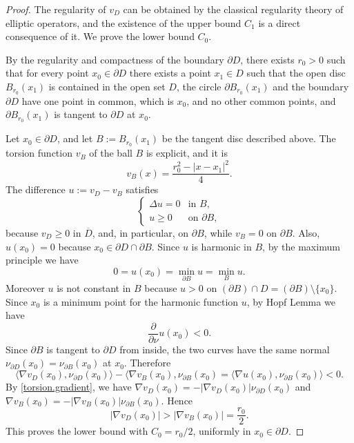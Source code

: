 \documentclass[10pt,reqno,a4paper]{article}
\numberwithin{equation}{section}
\theoremstyle{plain}
\theoremstyle{definition}
\newcommand{\la}{\langle}
\newcommand{\ra}{\rangle}
\newcommand{\pa}{\partial}
\begin{document}
\begin{proof}
The regularity of $v_D$ can be obtained by the classical regularity theory of elliptic operators, 
and the existence of the upper bound $C_1$ is a direct consequence of it. 
We prove the lower bound $C_0$.   

By the regularity and compactness of the boundary $\pa D$, 
there exists $r_0 > 0$ such that 
for every point $x_0 \in \pa D$ there exists a point $x_1 \in D$ such that 
the open disc $B_{r_0}(x_1)$ is contained in the open set $D$,  
the circle $\pa B_{r_0}(x_1)$ and the boundary $\pa D$ have one point in common, 
which is $x_0$, and no other common points, 
and $\pa B_{r_0}(x_1)$ is tangent to $\pa D$ at $x_0$. 

Let $x_0\in \pa D$, and let $B := B_{r_0}(x_1)$ be the tangent disc described above.  
The torsion function $v_B$ of the ball $B$ is explicit, and it is 
\[
v_B(x) = \frac{r_0^2 -|x-x_1|^2}{4}. 
\]
The difference $u := v_D-v_B$ satisfies
\[
\begin{cases}
\Delta u=0 & \text{in } B, 
\\
u \geq 0 & \text{on } \pa B, 
\end{cases}
\]
because $v_D \geq 0$ in $\overline D$, and, in particular, on $\pa B$, while $v_B = 0$ on $\pa B$. 
Also, $u(x_0) = 0$ because $x_0 \in \pa D \cap \pa B$. 
Since $u$ is harmonic in $B$, by the maximum principle we have 
\[
0 = u(x_0) = \min_{\pa B} u = \min_B u.
\]
Moreover $u$ is not constant in $B$ because $u>0$ on $(\pa B) \cap D = (\pa B) \setminus \{ x_0 \}$. 
Since $x_0$ is a minimum point for the harmonic function $u$, 
by Hopf Lemma we have
\[
\frac{\pa}{\pa \nu} u(x_0) < 0.
\] 
Since $\pa B$ is tangent to $\pa D$ from inside, 
the two curves have the same normal  
$\nu_{\pa D} (x_0) = \nu_{\pa B}(x_0)$ at $x_0$. Therefore
 \[
 \la \nabla v_D(x_0), \nu_{\pa D}(x_0)\ra
 - \la \nabla v_B(x_0), \nu_{\pa B}(x_0)
 = \la \nabla u(x_0), \nu_{\pa B}(x_0)\rangle <0.
 \]
By \eqref{torsion.gradient}, we have 
$\nabla v_D(x_0)= -|\nabla v_D(x_0)| \nu_{\pa D}(x_0)$ and 
$\nabla v_B(x_0)= -|\nabla v_B(x_0)| \nu_{\pa B}(x_0)$. 
Hence
\[
|\nabla v_D(x_0)| > |\nabla v_B (x_0)|= \frac{r_0}{2}.
\]
This proves the lower bound with $C_0 = r_0/2$, 
uniformly in $x_0 \in \pa D$. 
\end{proof}
\end{document}
